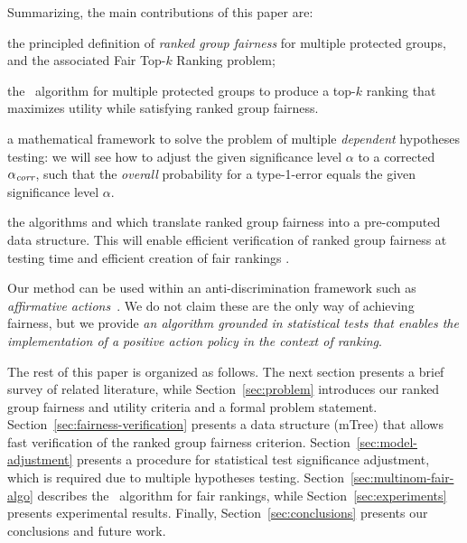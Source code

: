 Summarizing, the main contributions of this paper are:
\begin{compactenum}
	\item the principled definition of \emph{ranked group fairness} for multiple protected groups, and the associated {\sc Fair Top-$k$ Ranking problem};
	\item the \algoFAIR\ algorithm for multiple protected groups to produce a top-$k$ ranking that maximizes utility while satisfying ranked group fairness.
	\item a mathematical framework to solve the problem of multiple \emph{dependent} hypotheses testing: we will see how to adjust the given significance level $\alpha$ to a corrected $\alpha_\textit{corr}$, such that the \emph{overall} probability for a type-1-error equals the given significance level $\alpha$.
	\item the algorithms \algoComputeMTree and \algoCorrect which translate ranked group fairness into a pre-computed data structure. This will enable efficient verification of ranked group fairness at testing time and efficient creation of fair rankings .
\end{compactenum}

Our method can be used within an anti-discrimination framework such as \emph{affirmative actions}~\cite{sowell2005affirmative}.
%
We do not claim these are the only way of achieving fairness, but we provide \emph{an algorithm grounded in statistical tests that enables the implementation of a positive action policy in the context of ranking}.

The rest of this paper is organized as follows.
%
The next section presents a brief survey of related literature,
%
while Section~\ref{sec:problem} introduces our ranked group fairness and utility criteria and a formal problem statement.
%
Section~\ref{sec:fairness-verification} presents a data structure (mTree) that allows fast verification of the ranked group fairness criterion.
%
Section~\ref{sec:model-adjustment} presents a procedure for statistical test significance adjustment, which is required due to multiple hypotheses testing.
%
Section~\ref{sec:multinom-fair-algo} describes the \algoFAIR\ algorithm for fair rankings, while Section~\ref{sec:experiments} presents experimental results.
%
Finally, Section~\ref{sec:conclusions} presents our conclusions and future work.
